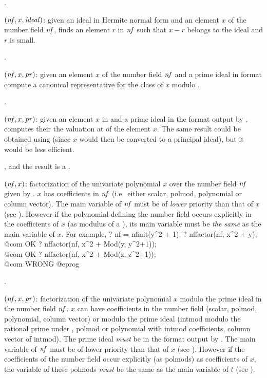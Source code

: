 .

$(\hbox{\it nf\/},x,\hbox{\it ideal\/})$: given an ideal in
Hermite normal form and an element $x$ of the number field $\hbox{\it nf\/}$,
finds an element $r$ in $\hbox{\it nf\/}$ such that $x-r$ belongs to the ideal
and $r$ is small.

.

$(\hbox{\it nf\/},x,\hbox{\it pr\/})$: given
an element $x$ of the number field $\hbox{\it nf\/}$ and a prime ideal  in
 format compute a canonical representative for the class of $x$
modulo .

.

$(\hbox{\it nf\/},x,\hbox{\it pr\/})$: given an element $x$ in
 and a prime ideal  in the format output by
, computes their the valuation at  of the
element $x$. The same result could be obtained using
 (since $x$ would then be converted to a
principal ideal), but it would be less efficient.

, and the result is a .

$(\hbox{\it nf\/},x)$: factorization of the univariate
polynomial $x$ over the number field $\hbox{\it nf\/}$ given by . $x$
has coefficients in $\hbox{\it nf\/}$ (i.e.~either scalar, polmod, polynomial or
column vector). The main variable of $\hbox{\it nf\/}$ must be of \emph{lower}
priority than that of $x$ (see ). However if
the polynomial defining the number field occurs explicitly  in the
coefficients of $x$ (as modulus of a ), its main variable must be
\emph{the same} as the main variable of $x$. For example,
\bprog
? nf = nfinit(y^2 + 1);
? nffactor(nf, x^2 + y); \\@com OK
? nffactor(nf, x^2 + Mod(y, y^2+1)); \\ @com OK
? nffactor(nf, x^2 + Mod(z, z^2+1)); \\ @com WRONG
@eprog

.

$(\hbox{\it nf\/},x,\hbox{\it pr\/})$: factorization of the
univariate polynomial $x$ modulo the prime ideal  in the number
field $\hbox{\it nf\/}$. $x$ can have coefficients in the number field (scalar,
polmod, polynomial, column vector) or modulo the prime ideal (intmod
modulo the rational prime under , polmod or polynomial with
intmod coefficients, column vector of intmod). The prime ideal
 \emph{must} be in the format output by . The
main variable of $\hbox{\it nf\/}$ must be of lower priority than that of $x$
(see ). However if the coefficients of the number
field occur explicitly (as polmods) as coefficients of $x$, the variable of
these polmods \emph{must} be the same as the main variable of $t$ (see
).

